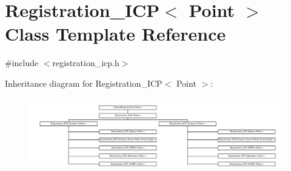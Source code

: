 \hypertarget{classRegistration__ICP}{
\section{Registration\_\-ICP$<$ Point $>$ Class Template Reference}
\label{classRegistration__ICP}
}


{\ttfamily \#include $<$registration\_\-icp.h$>$}

Inheritance diagram for Registration\_\-ICP$<$ Point $>$:\begin{figure}[H]
\begin{center}
\leavevmode
\includegraphics[height=3.303835cm]{classRegistration__ICP}
\end{center}
\end{figure}
